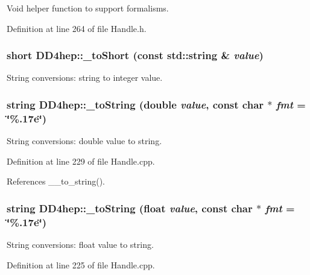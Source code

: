 Void helper function to support formalisms. 

Definition at line 264 of file Handle.h.\hypertarget{group___d_d4_h_e_p___g_e_o_m_e_t_r_y_gaef47a03e8cfb41d0bc2d598c16b7b9f2}{
\subsubsection[{\_\-toShort}]{\setlength{\rightskip}{0pt plus 5cm}short DD4hep::\_\-toShort (const std::string \& {\em value})}}
\label{group___d_d4_h_e_p___g_e_o_m_e_t_r_y_gaef47a03e8cfb41d0bc2d598c16b7b9f2}


String conversions: string to integer value. \hypertarget{group___d_d4_h_e_p___g_e_o_m_e_t_r_y_ga4e976c2563bd851ad9569c4a9c28d73a}{
\subsubsection[{\_\-toString}]{\setlength{\rightskip}{0pt plus 5cm}string DD4hep::\_\-toString (double {\em value}, \/  const char $\ast$ {\em fmt} = {\ttfamily \char`\"{}\%.17e\char`\"{}})}}
\label{group___d_d4_h_e_p___g_e_o_m_e_t_r_y_ga4e976c2563bd851ad9569c4a9c28d73a}


String conversions: double value to string. 

Definition at line 229 of file Handle.cpp.

References \_\-\_\-to\_\-string().\hypertarget{group___d_d4_h_e_p___g_e_o_m_e_t_r_y_ga0ade5df64f54ccda654522ce830b3c15}{
\subsubsection[{\_\-toString}]{\setlength{\rightskip}{0pt plus 5cm}string DD4hep::\_\-toString (float {\em value}, \/  const char $\ast$ {\em fmt} = {\ttfamily \char`\"{}\%.17e\char`\"{}})}}
\label{group___d_d4_h_e_p___g_e_o_m_e_t_r_y_ga0ade5df64f54ccda654522ce830b3c15}


String conversions: float value to string. 

Definition at line 225 of file Handle.cpp.

